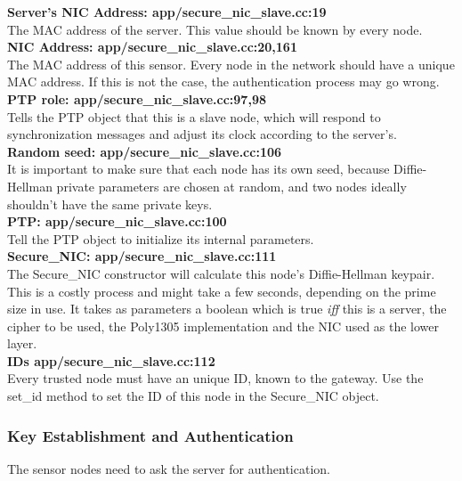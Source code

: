 \documentclass[a4paper,10pt]{article}   %
\begin{document}
		\textbf{Server's NIC Address: app/secure\_nic\_slave.cc:19} \\
		\indent The MAC address of the server. This value should be known by every node.\\

		\textbf{NIC Address: app/secure\_nic\_slave.cc:20,161} \\
		\indent The MAC address of this sensor. Every node in the network should have a unique MAC address. If this is not the case, the authentication process may go wrong.\\

		\textbf{PTP role: app/secure\_nic\_slave.cc:97,98} \\
		\indent Tells the PTP object that this is a slave node, which will respond to synchronization messages and adjust its clock according to the server's.\\

		\textbf{Random seed: app/secure\_nic\_slave.cc:106} \\
		\indent It is important to make sure that each node has its own seed, because Diffie-Hellman private parameters are chosen at random, and two nodes ideally shouldn't have the same private keys.\\

		\textbf{PTP: app/secure\_nic\_slave.cc:100} \\
		\indent Tell the PTP object to initialize its internal parameters.\\ 

		\textbf{Secure\_NIC: app/secure\_nic\_slave.cc:111} \\
		\indent The Secure\_NIC constructor will calculate this node's Diffie-Hellman keypair. This is a costly process and might take a few seconds, depending on the prime size in use. It takes as parameters a boolean which is true \textit{iff} this is a server, the cipher to be used, the Poly1305 implementation and the NIC used as the lower layer.\\

		\textbf{IDs app/secure\_nic\_slave.cc:112}\\
		\indent Every trusted node must have an unique ID, known to the gateway. Use the set\_id method to set the ID of this node in the Secure\_NIC object.\\

	\subsubsection{Key Establishment and Authentication}
	The sensor nodes need to ask the server for authentication.\\ 
\end{document}
